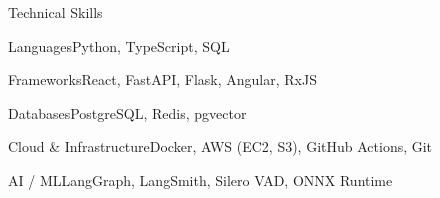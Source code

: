 \documentclass[
	11pt
]{../../../template}
\begin{document}
	\begin{rSection}{T}{echnical Skills}
		\begin{rSet}{Languages}{Python, TypeScript, SQL}
		\end{rSet}
		\begin{rSet}{Frameworks}{React, FastAPI, Flask, Angular, RxJS}
		\end{rSet}
		\begin{rSet}{Databases}{PostgreSQL, Redis, pgvector}
		\end{rSet}
		\begin{rSet}{Cloud \& Infrastructure}{Docker, AWS (EC2, S3), GitHub Actions, Git}
		\end{rSet}
		\begin{rSet}{AI / ML}{LangGraph, LangSmith, Silero VAD, ONNX Runtime}
		\end{rSet}
	\end{rSection}
\end{document}
